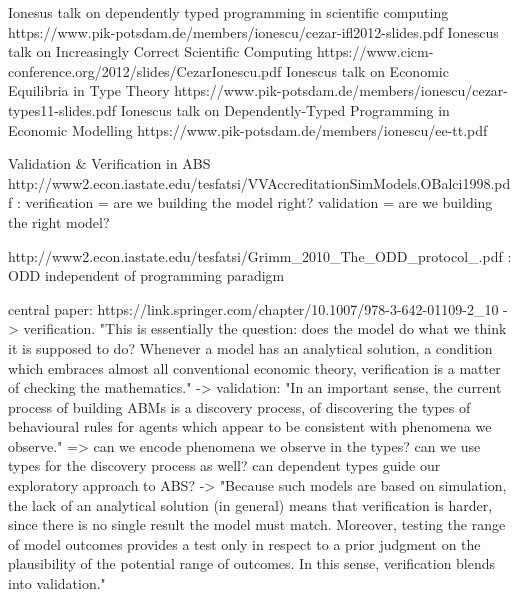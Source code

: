 Ionesus talk on dependently typed programming in scientific computing
https://www.pik-potsdam.de/members/ionescu/cezar-ifl2012-slides.pdf
Ionescus talk on Increasingly Correct Scientific Computing
https://www.cicm-conference.org/2012/slides/CezarIonescu.pdf
Ionescus talk on Economic Equilibria in Type Theory
https://www.pik-potsdam.de/members/ionescu/cezar-types11-slides.pdf
Ionescus talk on Dependently-Typed Programming in Economic Modelling
https://www.pik-potsdam.de/members/ionescu/ee-tt.pdf

Validation \& Verification in ABS
http://www2.econ.iastate.edu/tesfatsi/VVAccreditationSimModels.OBalci1998.pdf : verification = are we building the model right? validation = are we building the right model?

http://www2.econ.iastate.edu/tesfatsi/Grimm_2010_The_ODD_protocol_.pdf : ODD independent of programming paradigm

central paper: https://link.springer.com/chapter/10.1007/978-3-642-01109-2_10
	-> verification. "This is essentially the question: does the model do what we think it is supposed to do? Whenever a model has an analytical solution, a condition which embraces almost all conventional economic theory, verification is a matter of checking the mathematics."
	-> validation: "In an important sense, the current process of building ABMs is a discovery process, of discovering the types of behavioural rules for agents which appear to be consistent with phenomena we observe."
		=> can we encode phenomena we observe in the types? can we use types for the discovery process as well? can dependent types guide our exploratory approach to ABS?
	-> "Because such models are based on simulation, the lack of an analytical solution (in
general) means that verification is harder, since there is no single result the model
must match. Moreover, testing the range of model outcomes provides a test only in
respect to a prior judgment on the plausibility of the potential range of outcomes.
In this sense, verification blends into validation."


